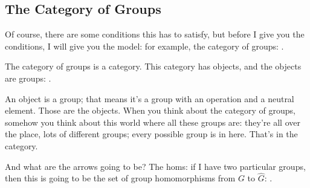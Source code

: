 \subsection{The Category of Groups}

\begin{speech}[01:07:57 - 01:09:08]
Of course, there are some conditions this has to satisfy, but before I give you the conditions, I will give you the model: for example, the category of groups: .

The category of groups is a category. This category has objects,  and the objects are groups: .

An object is a group; that means it's a group with an operation and a neutral element. Those are the objects. When you think about the category of groups, somehow you think about this world where all these groups are: they're all over the place, lots of different groups; every possible group is in here. That's in the category.

And what are the arrows going to be? The homs: if I have two particular groups,  then this is going to be the set of group homomorphisms  from $G$ to $\hat{G}$: .
\end{speech}

\begin{content}
\end{content}

